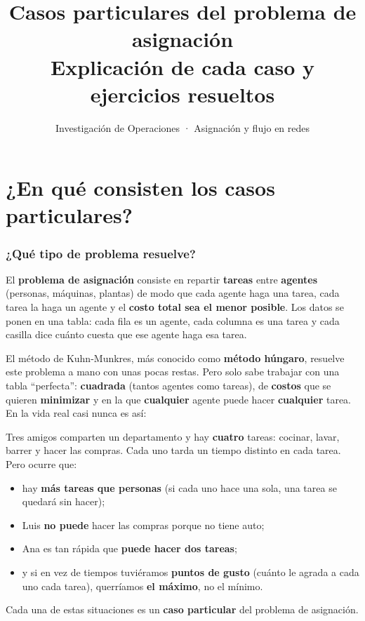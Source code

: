 \documentclass[11pt,a4paper]{article}
\title{\textbf{Casos particulares del problema de asignación}\\[4pt]\large Explicación de cada caso y ejercicios resueltos}
\author{Investigación de Operaciones · Asignación y flujo en redes}
\date{}
\begin{document}
\maketitle
\tableofcontents
\newpage

\part{¿En qué consisten los casos particulares?}

\section{¿Qué tipo de problema resuelve?}

El \textbf{problema de asignación} consiste en repartir \textbf{tareas} entre \textbf{agentes} (personas,
máquinas, plantas) de modo que cada agente haga una tarea, cada tarea la haga un agente y el
\textbf{costo total sea el menor posible}. Los datos se ponen en una tabla: cada fila es un agente, cada
columna es una tarea y cada casilla dice cuánto cuesta que ese agente haga esa tarea.

El método de Kuhn-Munkres, más conocido como \textbf{método húngaro}, resuelve este problema a mano con
unas pocas restas. Pero solo sabe trabajar con una tabla ``perfecta'': \textbf{cuadrada} (tantos agentes como
tareas), de \textbf{costos} que se quieren \textbf{minimizar} y en la que \textbf{cualquier} agente puede hacer
\textbf{cualquier} tarea. En la vida real casi nunca es así:

\begin{ojo}
Tres amigos comparten un departamento y hay \textbf{cuatro} tareas: cocinar, lavar, barrer y hacer las compras.
Cada uno tarda un tiempo distinto en cada tarea. Pero ocurre que:
\begin{itemize}[itemsep=1pt, topsep=2pt]
  \item hay \textbf{más tareas que personas} (si cada uno hace una sola, una tarea se quedará sin hacer);
  \item Luis \textbf{no puede} hacer las compras porque no tiene auto;
  \item Ana es tan rápida que \textbf{puede hacer dos tareas};
  \item y si en vez de tiempos tuviéramos \textbf{puntos de gusto} (cuánto le agrada a cada uno cada tarea),
        querríamos \textbf{el máximo}, no el mínimo.
\end{itemize}
Cada una de estas situaciones es un \textbf{caso particular} del problema de asignación.
\end{ojo}
\end{document}
